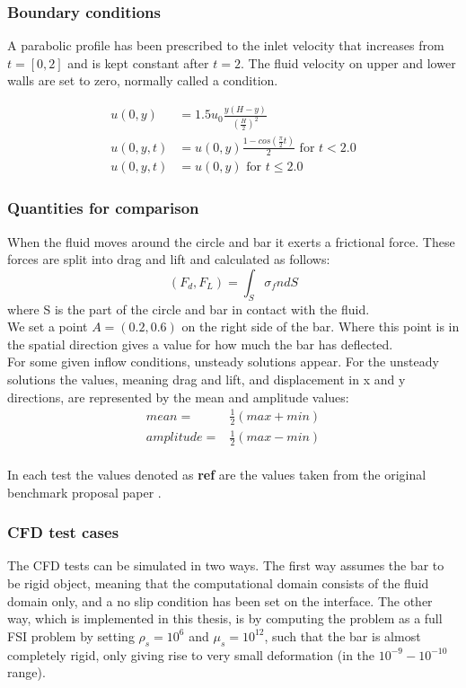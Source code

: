 \subsubsection*{Boundary conditions}
A parabolic profile has been prescribed to the inlet velocity that increases from $t=[0,2]$ and is kept constant after $t = 2$.
The fluid velocity on upper and lower walls are set to zero, normally called a  condition.

\begin{align*}
u(0,y) &= 1.5u_0 \frac{y(H-y)}{(\frac{H}{2})^2}  \\
u(0,y,t) &= u(0,y)\frac{1-cos(\frac{\pi}{2}t)}{2} \text{  for  } t<2.0 \\
u(0,y,t) &= u(0,y) \text{  for  } t \leq 2.0
\end{align*}

\subsubsection*{Quantities for comparison}
When the fluid moves around the circle and bar it exerts a frictional force. These forces are split into drag and lift and calculated as follows:
$$ (F_d, F_L) = \int_S \sigma_f n dS $$ 
where S is the part of the circle and bar in contact with the fluid. \\
We set a point $A = (0.2,0.6)$ on the right side of the bar. Where this point is in the spatial direction gives a value for how much the bar has deflected. \\
For some given inflow conditions, unsteady solutions appear. For the unsteady solutions the values, meaning drag and lift, and displacement in x and y directions, are represented by the mean and amplitude values:
\begin{align}
mean =& \frac{1}{2} (max + min) \\
amplitude =& \frac{1}{2} (max - min)\\
\end{align}

In each test the values denoted as \textbf{ref} are the values taken from the original benchmark proposal paper \cite{Hron2006a}. 

\subsubsection{CFD test cases}
The CFD tests can be simulated in two ways. The first way assumes the bar to be rigid object, meaning that the computational domain consists of the fluid domain only, and a no slip condition has been set on the interface. The other way, which is implemented in this thesis, is by computing the problem as a full FSI problem by setting $\rho_s=10^{6}$ and $\mu_s=10^{12}$, such that the bar is almost completely rigid, only giving rise to very small deformation (in the $10^{-9}-10^{-10}$ range).

